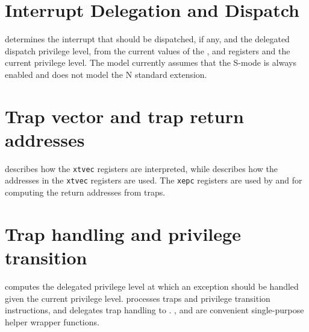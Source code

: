 \section{Interrupt Delegation and Dispatch}
\label{s:priv-sail-intrs}

 determines the interrupt that should be
dispatched, if any, and the delegated dispatch privilege level, from
the current values of the ,  and
 registers and the current privilege level.  The
model currently assumes that the S-mode is always enabled and does not
model the N standard extension.

\begin{formalspec}
  \sailfnfindPendingInterrupt
  \sailtypeinterruptSet
  \sailfnprocessPending
  \sailfngetPendingSet
  \sailfndispatchInterrupt
\end{formalspec}

\section{Trap vector and trap return addresses}
\label{s:priv-sail-tvecs}

 describes how the {\tt xtvec} registers are
interpreted, while  describes how the
addresses in the {\tt xtvec} registers are used. The {\tt xepc}
registers are used by  and
 for computing the return addresses from
traps.

\begin{formalspec}
  \sailfntvecAddr
  \sailfnprepareTrapVector
  \sailfngetXretTarget
  \sailfnsetXretTarget
\end{formalspec}

\section{Trap handling and privilege transition}
\label{s:priv-sail-traps}

 computes the delegated privilege
level at which an exception should be handled given the current
privilege level.   processes traps and
privilege transition instructions, and delegates trap handling to
.  ,
 and  are
convenient single-purpose helper wrapper functions.

